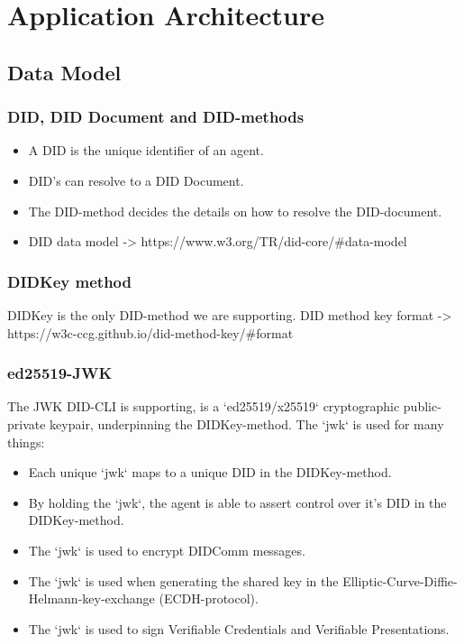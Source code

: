 \chapter{Application Architecture}

\section{Data Model}



\subsection{DID, DID Document and DID-methods}
\begin{itemize}
\item A DID is the unique identifier of an agent.
\item DID's can resolve to a DID Document.
\item The DID-method decides the details on how to resolve the DID-document.
\item DID data model -> https://www.w3.org/TR/did-core/\#data-model
\end{itemize}



\subsection{DIDKey method}

DIDKey is the only DID-method we are supporting. DID method key format -> https://w3c-ccg.github.io/did-method-key/\#format



\subsection{ed25519-JWK}

The JWK DID-CLI is supporting, is a `ed25519/x25519` cryptographic public-private keypair, underpinning the DIDKey-method. The `jwk` is used for many things:
\begin{itemize}
\item Each unique `jwk` maps to a unique DID in the DIDKey-method.
\item By holding the `jwk`, the agent is able to assert control over it's DID in the DIDKey-method.
\item The `jwk` is used to encrypt DIDComm messages.
\item The `jwk` is used when generating the shared key in the Elliptic-Curve-Diffie-Helmann-key-exchange (ECDH-protocol).
\item The `jwk` is used to sign Verifiable Credentials and Verifiable Presentations.
\end{itemize}

